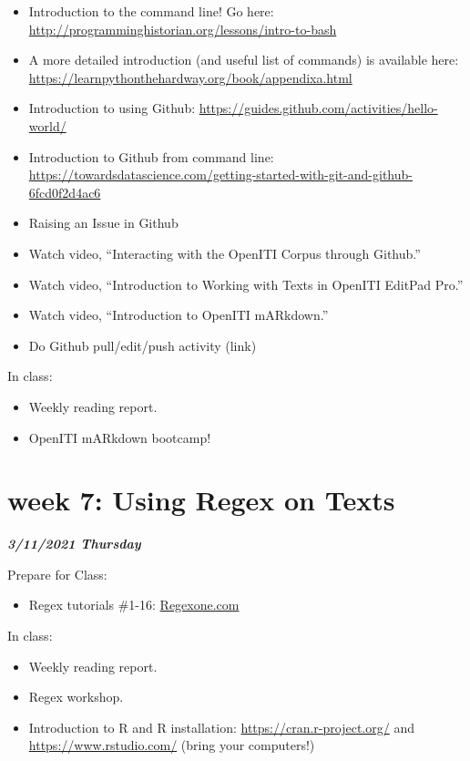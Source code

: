 \documentclass[
]{book}
\providecommand{\tightlist}{%
  \setlength{\itemsep}{0pt}\setlength{\parskip}{0pt}}
\begin{document}
\begin{itemize}
\tightlist
\item
  Introduction to the command line! Go here: \url{http://programminghistorian.org/lessons/intro-to-bash}
\item
  A more detailed introduction (and useful list of commands) is available here: \url{https://learnpythonthehardway.org/book/appendixa.html}
\item
  Introduction to using Github: \url{https://guides.github.com/activities/hello-world/}
\item
  Introduction to Github from command line: \url{https://towardsdatascience.com/getting-started-with-git-and-github-6fcd0f2d4ac6}
\item
  Raising an Issue in Github
\item
  Watch video, ``Interacting with the OpenITI Corpus through Github.''
\item
  Watch video, ``Introduction to Working with Texts in OpenITI EditPad Pro.''
\item
  Watch video, ``Introduction to OpenITI mARkdown.''
\item
  Do Github pull/edit/push activity (link)
\end{itemize}

In class:

\begin{itemize}
\tightlist
\item
  Weekly reading report.
\item
  OpenITI mARkdown bootcamp!
\end{itemize}

\hypertarget{week-7-using-regex-on-texts-1}{%
\chapter{week 7: Using Regex on Texts}\label{week-7-using-regex-on-texts-1}}

\textbf{\emph{3/11/2021 Thursday}}

Prepare for Class:

\begin{itemize}
\tightlist
\item
  Regex tutorials \#1-16: \url{Regexone.com}
\end{itemize}

In class:

\begin{itemize}
\tightlist
\item
  Weekly reading report.
\item
  Regex workshop.
\item
  Introduction to R and R installation: \url{https://cran.r-project.org/} and \url{https://www.rstudio.com/} (bring your computers!)
\end{itemize}
\end{document}
